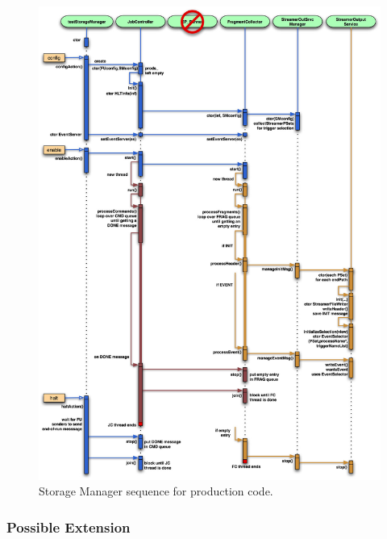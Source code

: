 \begin{figure}[hbtp]
  \begin{center}
    \includegraphics[width=6.0in]{SM_prd_code3_prt-2.eps}
    \caption{Storage Manager sequence for production code.}
    \label{fig:base_SMPRD_code}
  \end{center}
\end{figure}


\subsubsection{Possible Extension}


